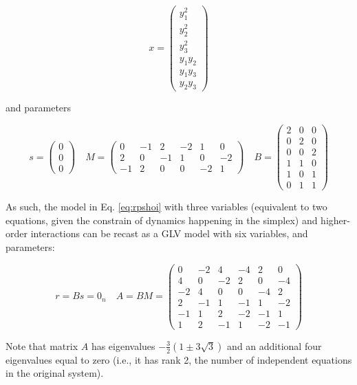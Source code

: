 \documentclass{article}
\begin{document}
\begin{equation}
\label{eq:rpshoimon}
x = 
\begin{pmatrix}
y_1^2\\ y_2^2 \\ y_3^2 \\ y_1 y_2 \\ y_1 y_3 \\ y_2 y_3
\end{pmatrix} 
\end{equation}

and parameters

\begin{equation}
\label{eq:rpshoiqp}
s = \begin{pmatrix}
0\\
0\\
0
\end{pmatrix} \quad 
M = \begin{pmatrix}
0 & -1 & 2 & -2 & 1 & 0\\
2 & 0 & -1 & 1 & 0 & -2\\
-1 & 2 & 0 & 0 & -2 & 1
\end{pmatrix} \quad
B = \begin{pmatrix}
2 & 0 & 0 \\
0 & 2 & 0 \\
0 & 0 & 2 \\
1 & 1 & 0 \\
1 & 0 & 1 \\
0 & 1 & 1
\end{pmatrix}
\end{equation}

As such, the model in Eq. \ref{eq:rpshoi} with three variables
(equivalent to two equations, given the constrain of dynamics happening
in the simplex) and higher-order interactions can be recast as a GLV
model with six variables, and parameters:

\begin{equation}
r = B s = 0_n
\quad
A = B M = \begin{pmatrix}
0 & -2 & 4 & -4 & 2 & 0 \\ 
4 & 0 & -2 & 2 & 0 & -4 \\ 
-2 & 4 & 0 & 0 & -4 & 2 \\ 
2 & -1 & 1 & -1 & 1 & -2 \\ 
-1 & 1 & 2 & -2 & -1 & 1 \\ 
1 & 2 & -1 & 1 & -2 & -1
\end{pmatrix}
\end{equation}

Note that matrix \(A\) has eigenvalues
\(-\frac{3}{2}(1 \pm 3 \sqrt{3})\) and an additional four eigenvalues
equal to zero (i.e., it has rank 2, the number of independent equations
in the original system).
\end{document}

